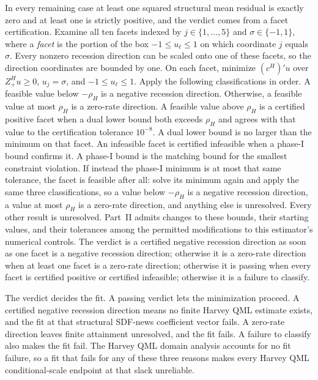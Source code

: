 \documentclass[11pt]{article}
\begin{document}
In every remaining case at least one squared structural mean residual is exactly zero and at least
one is strictly positive, and the verdict comes from a facet certification. Examine all ten facets
indexed by \(j\in\{1,\ldots,5\}\) and \(\sigma\in\{-1,1\}\), where a \emph{facet} is the portion of
the box \(-1\le u_\ell\le1\) on which coordinate \(j\) equals \(\sigma\). Every nonzero recession direction can
be scaled onto one of these facets, so the direction coordinates are bounded by one. On each facet,
minimize \((c^H)'u\) over \(Z_+^Hu\ge0\), \(u_j=\sigma\), and \(-1\le u_\ell\le1\). Apply the following
classifications in order. A feasible value below \(-\rho_H\) is a negative recession direction.
Otherwise, a feasible value at most \(\rho_H\) is a zero-rate direction. A feasible value above
\(\rho_H\) is a certified positive facet when a dual lower bound both exceeds \(\rho_H\) and agrees
with that value to the certification tolerance \(10^{-8}\). A dual lower bound is
no larger than the minimum on that facet. An infeasible facet is certified infeasible when a phase-I
bound confirms it. A phase-I bound is the matching bound for the smallest constraint violation. If
instead the phase-I minimum is at most that same tolerance, the facet is feasible after all:
solve its minimum again and apply the same three classifications, so a value below \(-\rho_H\) is a
negative recession direction, a value at most \(\rho_H\) is a zero-rate direction, and anything else
is unresolved.
Every other result is unresolved. Part~II admits changes to these bounds, their starting values, and
their tolerances among the permitted modifications to this estimator's numerical controls. The
verdict is a certified negative recession direction as soon as one facet is a negative recession
direction; otherwise it is a zero-rate direction when at least one facet is a zero-rate direction;
otherwise it is passing when every facet is certified positive or certified infeasible; otherwise it
is a failure to classify.

The verdict decides the fit. A passing verdict lets the minimization proceed. A certified negative
recession direction means no finite Harvey QML estimate exists, and the fit at that structural
SDF-news coefficient vector fails. A zero-rate direction leaves finite attainment unresolved, and
the fit fails. A failure to classify also makes the fit fail. The Harvey QML domain analysis accounts for
no fit failure, so a fit that fails for any of these three reasons makes every Harvey QML
conditional-scale endpoint at that slack unreliable.
\end{document}
